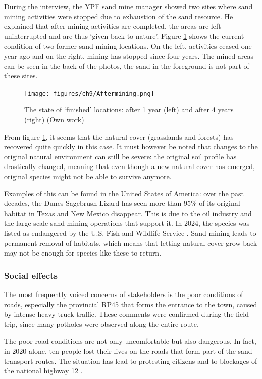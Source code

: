 During the interview, the YPF sand mine manager showed two sites where sand mining activities were stopped due to exhaustion of the sand resource. He explained that after mining activities are completed, the areas are left uninterrupted and are thus `given back to nature'. Figure \ref{fig:aftermining} shows the current condition of two former sand mining locations. On the left, activities ceased one year ago and on the right, mining has stopped since four years. The mined areas can be seen in the back of the photos, the sand in the foreground is not part of these sites.

\begin{figure}[H]
    \centering
    \texttt{[image: figures/ch9/Aftermining.png]}
    \caption{The state of `finished' locations: after 1 year (left) and after 4 years (right) (Own work)}
    \label{fig:aftermining}
\end{figure}

From figure \ref{fig:aftermining}, it seems that the natural cover (grasslands and forests) has recovered quite quickly in this case. It must however be noted that changes to the original natural environment can still be severe: the original soil profile has drastically changed, meaning that even though a new natural cover has emerged, original species might not be able to survive anymore.

Examples of this can be found in the United States of America: over the past decades, the Dunes Sagebrush Lizard has seen more than 95\% of its original habitat in Texas and New Mexico disappear. This is due to the oil industry and the large scale sand mining operations that support it. In 2024, the species was listed as endangered by the U.S. Fish and Wildlife Service \autocite{centerforbiologicaldiversityLegalInterventionLaunched2025}. Sand mining leads to permanent removal of habitats, which means that letting natural cover grow back may not be enough for species like these to return.

\subsubsection{Social effects}
The most frequently voiced concerns of stakeholders is the poor conditions of roads, especially the provincial RP45 that forms the entrance to the town, caused by intense heavy truck traffic. These comments were confirmed during the field trip, since many potholes were observed along the entire route.

The poor road conditions are not only uncomfortable but also dangerous. In fact, in 2020 alone, ten people lost their lives on the roads that form part of the sand transport routes. The situation has lead to protesting citizens and to blockages of the national highway 12 \autocite{novasImpactoAmbientalOculto2022}.

